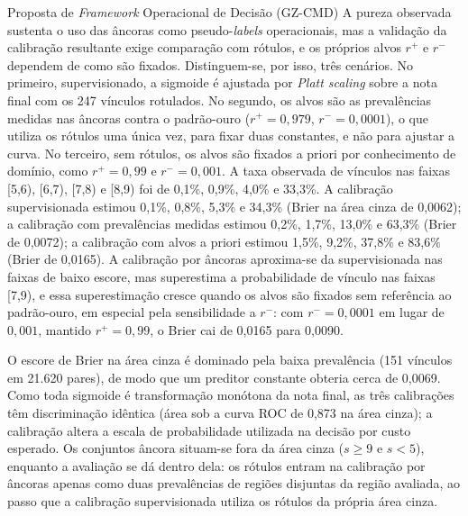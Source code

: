 \begin{chapter}{Proposta de \textit{Framework} Operacional de Decisão (GZ-CMD)}
A pureza observada sustenta o uso das âncoras como pseudo-\textit{labels} operacionais, mas a validação da calibração resultante exige comparação com rótulos, e os próprios alvos $r^+$ e $r^-$ dependem de como são fixados. Distinguem-se, por isso, três cenários. No primeiro, supervisionado, a sigmoide é ajustada por \textit{Platt scaling} sobre a nota final com os 247 vínculos rotulados. No segundo, os alvos são as prevalências medidas nas âncoras contra o padrão-ouro ($r^+ = 0{,}979$, $r^- = 0{,}0001$), o que utiliza os rótulos uma única vez, para fixar duas constantes, e não para ajustar a curva. No terceiro, sem rótulos, os alvos são fixados a priori por conhecimento de domínio, como $r^+ = 0{,}99$ e $r^- = 0{,}001$. A taxa observada de vínculos nas faixas [5,6), [6,7), [7,8) e [8,9) foi de 0,1\%, 0,9\%, 4,0\% e 33,3\%. A calibração supervisionada estimou 0,1\%, 0,8\%, 5,3\% e 34,3\% (Brier na área cinza de 0,0062); a calibração com prevalências medidas estimou 0,2\%, 1,7\%, 13,0\% e 63,3\% (Brier de 0,0072); a calibração com alvos a priori estimou 1,5\%, 9,2\%, 37,8\% e 83,6\% (Brier de 0,0165). A calibração por âncoras aproxima-se da supervisionada nas faixas de baixo escore, mas superestima a probabilidade de vínculo nas faixas [7,9), e essa superestimação cresce quando os alvos são fixados sem referência ao padrão-ouro, em especial pela sensibilidade a $r^-$: com $r^- = 0{,}0001$ em lugar de $0{,}001$, mantido $r^+ = 0{,}99$, o Brier cai de 0,0165 para 0,0090.

O escore de Brier na área cinza é dominado pela baixa prevalência (151 vínculos em 21.620 pares), de modo que um preditor constante obteria cerca de 0,0069. Como toda sigmoide é transformação monótona da nota final, as três calibrações têm discriminação idêntica (área sob a curva ROC de 0,873 na área cinza); a calibração altera a escala de probabilidade utilizada na decisão por custo esperado. Os conjuntos âncora situam-se fora da área cinza ($s\geq 9$ e $s<5$), enquanto a avaliação se dá dentro dela: os rótulos entram na calibração por âncoras apenas como duas prevalências de regiões disjuntas da região avaliada, ao passo que a calibração supervisionada utiliza os rótulos da própria área cinza.


\end{chapter}
